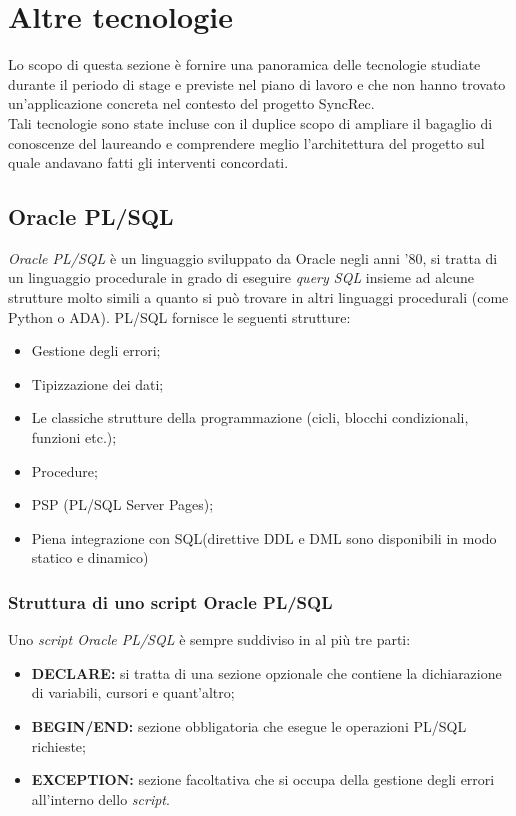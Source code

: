 

\chapter{Altre tecnologie} \label{Appendice-1}

Lo scopo di questa sezione è fornire una panoramica delle tecnologie studiate durante il periodo di stage e previste nel piano di lavoro e che non hanno trovato un'applicazione concreta nel contesto del progetto SyncRec.\\
Tali tecnologie sono state incluse con il duplice scopo di ampliare il bagaglio di conoscenze del laureando e comprendere meglio l'architettura del progetto sul quale andavano fatti gli interventi concordati.

\section{Oracle PL/SQL}
\textit{Oracle PL/SQL} è un linguaggio sviluppato da Oracle negli anni '80, si tratta di un linguaggio procedurale in grado di eseguire \textit{query SQL} insieme ad alcune strutture molto simili a quanto si può trovare in altri linguaggi procedurali (come \gls{Python} o \gls{ADA}).
PL/SQL fornisce le seguenti strutture:
\begin{itemize}
	\item Gestione degli errori;
	\item Tipizzazione dei dati;
	\item Le classiche strutture della programmazione (cicli, blocchi condizionali, funzioni etc.);
	\item Procedure;
	\item PSP (PL/SQL Server Pages);
	\item Piena integrazione con SQL(direttive DDL e DML sono disponibili in modo statico e dinamico)
\end{itemize}

\subsection{Struttura di uno script Oracle PL/SQL}
Uno \textit{script Oracle PL/SQL} è sempre suddiviso in al più tre parti:
\begin{itemize}
	\item \textbf{DECLARE:} si tratta di una sezione opzionale che contiene la dichiarazione di variabili, cursori e quant'altro;
	\item \textbf{BEGIN/END:} sezione obbligatoria che esegue le operazioni PL/SQL richieste;
	\item \textbf{EXCEPTION:} sezione facoltativa che si occupa della gestione degli errori all'interno dello \textit{script}.
\end{itemize}

